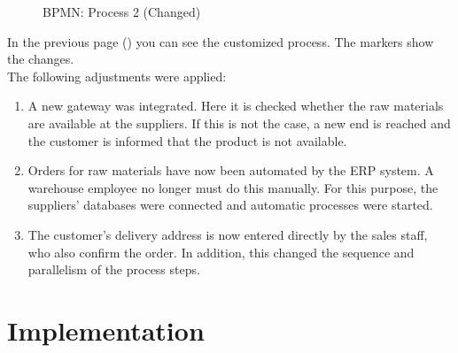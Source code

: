     \begin{figure}[H]
        \centering
        \caption{BPMN: Process 2 (Changed)}
        \label{bpmn2}
    \end{figure}
    In the previous page (\pageref{bpmn2}) you can see the customized process. The markers show the changes.\\
    The following adjustments were applied:
    \begin{enumerate}
        \item A new gateway was integrated. Here it is checked whether the raw materials are available at the suppliers. If this is not the case, a new end is reached and the customer is informed that the product is not available.
        \item Orders for raw materials have now been automated by the ERP system. A warehouse employee no longer must do this manually. For this purpose, the suppliers' databases were connected and automatic processes were started.
        \item The customer's delivery address is now entered directly by the sales staff, who also confirm the order. In addition, this changed the sequence and parallelism of the process steps.
    \end{enumerate}
\clearpage
\chapter{Implementation}

